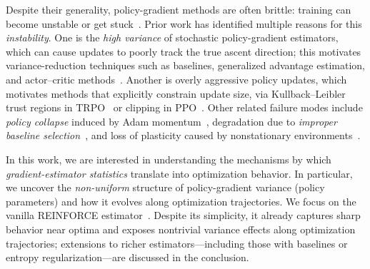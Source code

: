 Despite their generality, policy-gradient methods are often brittle: training can become unstable or get stuck~\cite{henderson18aaai-rlimplementation,dohare23ewrl-policycollapse}. 
Prior work has identified multiple reasons for this \emph{instability}. One is the \emph{high variance} of stochastic policy-gradient estimators, which can cause updates to poorly track the true ascent direction; this motivates variance-reduction techniques such as baselines, generalized advantage estimation, and actor--critic methods~\cite{sutton99neurips-policygradient, greensmith04jmlr-variancereduction, schulman15iclr-gae, haarnoja18icml-sac}. 
Another is overly aggressive policy updates, which motivates methods that explicitly constrain update size, \eg via Kullback–Leibler trust regions in TRPO~\cite{schulman15icml-trpo} or clipping in PPO~\cite{schulman17arxiv-ppo}. 
Other related failure modes include \emph{policy collapse} induced by Adam momentum~\cite{dohare23ewrl-policycollapse}, degradation due to \emph{improper baseline selection}~\cite{chung21icml-committalbaselines,mei22neurips-committalbaselines}, and loss of plasticity caused by nonstationary environments~\cite{sokar23icml-dormant, kumar23arxiv-maintaining, muppidi24neurips-trac}.

In this work, we are interested in understanding the mechanisms by which \emph{gradient-estimator statistics} translate into optimization behavior. In particular, we uncover the \emph{non-uniform} structure of policy-gradient variance (\wrt policy parameters) and how it evolves along optimization trajectories.
We focus on the vanilla REINFORCE estimator~\cite{sutton99neurips-policygradient}. Despite its simplicity, it already captures sharp behavior near optima and exposes nontrivial variance effects along optimization trajectories; extensions to richer estimators---including those with baselines or entropy regularization---are discussed in the conclusion.


